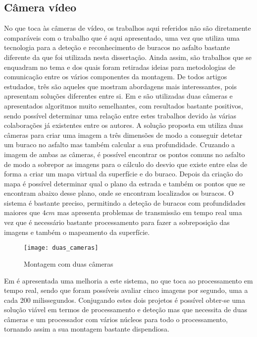 \subsection{Câmera vídeo}
\label{subsec: camera_video}
No que toca às câmeras de vídeo, os trabalhos aqui referidos não são diretamente comparáveis com o trabalho que é aqui apresentado, uma vez que utiliza uma tecnologia para a deteção e reconhecimento de buracos no asfalto bastante diferente da que foi utilizada nesta dissertação.
Ainda assim, são trabalhos que se enquadram no tema e dos quais foram retiradas ideias para metodologias de comunicação entre os vários componentes da montagem.
De todos artigos estudados, três são aqueles que mostram abordagens mais interessantes, pois apresentam soluções diferentes entre si.
Em \cite{Zhang} e \cite{Chan2014} são utilizadas duas câmeras e apresentados algoritmos muito semelhantes, com resultados bastante positivos, sendo possível determinar uma relação entre estes trabalhos devido às várias colaborações já existentes entre os autores.
A solução proposta em \cite{Zhang} utiliza duas câmeras para criar uma imagem a três dimensões de modo a conseguir detetar um buraco no asfalto mas também calcular a sua profundidade.
Cruzando a imagem de ambas as câmeras, é possível encontrar os pontos comuns no asfalto de modo a sobrepor as imagens para o cálculo do desvio que existe entre elas de forma a criar um mapa virtual da superfície e do buraco.
Depois da criação do mapa é possível determinar qual o plano da estrada e também os pontos que se encontram abaixo desse plano, onde se encontram localizados os buracos.
O sistema é bastante preciso, permitindo a deteção de buracos com profundidades maiores que $4 cm$ mas apresenta problemas de transmissão em tempo real uma vez que é necessário bastante processamento para fazer a sobreposição das imagens e também o mapeamento da superfície.

\begin{figure}[htbp]
	\centering
	\texttt{[image: duas\_cameras]}
	\caption[Montagem com duas câmeras]{Montagem com duas câmeras \footnotemark}
	\label{fig:montagem_com_duas_cameras}
\end{figure}


Em \cite{Chan2014} é apresentada uma melhoria a este sistema, no que toca ao processamento em tempo real, sendo que foram possíveis avaliar cinco imagens por segundo, uma a cada 200 milissegundos.
Conjugando estes dois projetos é possível obter-se uma solução viável em termos de processamento e deteção mas que necessita de duas câmeras e um processador com vários núcleos para todo o processamento, tornando assim a sua montagem bastante dispendiosa.

